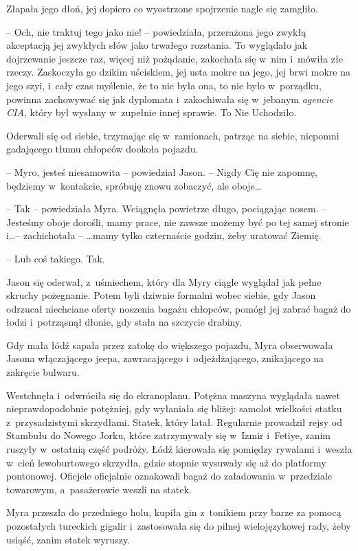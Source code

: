 \documentclass[oneside,polish,11pt,sfheadings]{mwbk}
\begin{document}
Złapała jego dłoń, jej dopiero co wyostrzone spojrzenie nagle się
zamgliło. 

-- Och, nie traktuj tego jako nie! -- powiedziała, przerażona
jego zwykłą akceptacją jej zwykłych słów jako trwałego rozstania. To
wyglądało jak dojrzewanie jeszcze raz, więcej niż pożądanie, zakochała
się w~nim i~mówiła złe rzeczy. Zaskoczyła go dzikim uściskiem, jej usta
mokre na jego, jej brwi mokre na jego szyi, i~cały czas myślenie, że to
nie była ona, to nie było w~porządku, powinna zachowywać się jak
dyplomata i~zakochiwała się w~jebanym \textit{agencie CIA}, który był
wysłany w~zupełnie innej sprawie. To Nie Uchodziło.

Oderwali się od siebie, trzymając się w~ramionach, patrząc na siebie,
niepomni gadającego tłumu chłopców dookoła pojazdu.

-- Myro, jesteś niesamowita -- powiedział Jason. -- Nigdy Cię nie zapomnę,
będziemy w~kontakcie, spróbuję znowu zobaczyć, ale oboje\ldots

-- Tak -- powiedziała Myra. Wciągnęła powietrze długo, pociągając nosem. -- Jesteśmy oboje dorośli, mamy prace, nie zawsze możemy być po tej samej
stronie i\ldots -- zachichotała -- \ldots mamy tylko czternaście godzin, żeby
uratować Ziemię.

-- Lub coś takiego. Tak.

Jason się oderwał, z~uśmiechem, który dla Myry ciągle wyglądał jak pełne
skruchy pożegnanie. Potem byli dziwnie formalni wobec siebie, gdy Jason
odrzucał niechciane oferty noszenia bagażu chłopców, pomógł jej zabrać
bagaż do łodzi i~potrząsnął dłonie, gdy stała na szczycie drabiny.

Gdy mała łódź sapała przez zatokę do większego pojazdu, Myra obserwowała
Jasona włączającego jeepa, zawracającego i~odjeżdżającego, znikającego
na zakręcie bulwaru.

Westchnęła i~odwróciła się do ekranoplanu. Potężna maszyna wyglądała
nawet nieprawdopodobnie potężniej, gdy wyłaniała się bliżej: samolot
wielkości statku z~przysadzistymi skrzydłami. Statek, który latał.
Regularnie prowadził rejsy od Stambułu do Nowego Jorku, które
zatrzymywały się w~Izmir i~Fetiye, zanim ruszyły w~ostatnią część
podróży. Łódź kierowała się pomiędzy rywalami i~weszła w~cień
lewoburtowego skrzydła, gdzie stopnie wysuwały się aż do platformy
pontonowej. Oficjele oficjalnie oznakowali bagaż do załadowania w~przedziale towarowym, a~pasażerowie weszli na statek.

Myra przeszła do przedniego holu, kupiła gin z~tonikiem przy barze za
pomocą pozostałych tureckich gigalir i~zastosowała się do pilnej
wielojęzykowej rady, żeby usiąść, zanim statek wyruszy.
\end{document}
